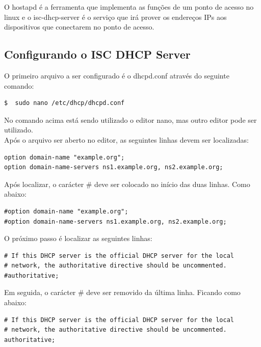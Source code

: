 O hostapd é a ferramenta que implementa as funções de um ponto de acesso no linux e o isc-dhcp-server é o serviço que irá prover os endereços IPs aos dispositivos que conectarem no ponto de acesso.

\subsection{Configurando o ISC DHCP Server}
\label{sec:isc-dhcp-server}

O primeiro arquivo a ser configurado é o dhcpd.conf através do seguinte comando: \\

\begin{lstlisting}[language=bash]
$  sudo nano /etc/dhcp/dhcpd.conf
\end{lstlisting}

No comando acima está sendo utilizado o editor nano, mas outro editor pode ser utilizado. \\
\indent Após o arquivo ser aberto no editor, as seguintes linhas devem ser localizadas: \\

\begin{lstlisting}
option domain-name "example.org";
option domain-name-servers ns1.example.org, ns2.example.org;
\end{lstlisting}

Após localizar, o carácter \# deve ser colocado no início das duas linhas. Como abaixo: \\

\begin{lstlisting}
#option domain-name "example.org";
#option domain-name-servers ns1.example.org, ns2.example.org;
\end{lstlisting}

O próximo passo é localizar as seguintes linhas: \\

\begin{lstlisting}
# If this DHCP server is the official DHCP server for the local
# network, the authoritative directive should be uncommented.
#authoritative;
\end{lstlisting}

Em seguida, o carácter \# deve ser removido da última linha. Ficando como abaixo: \\

\begin{lstlisting}
# If this DHCP server is the official DHCP server for the local
# network, the authoritative directive should be uncommented.
authoritative;
\end{lstlisting}

